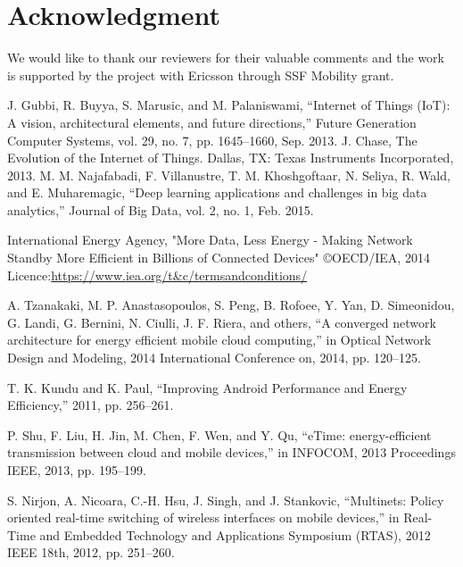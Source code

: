 \documentclass[journal]{IEEEtran}
\begin{document}
%

\section*{Acknowledgment}
We would like to thank our reviewers for their valuable comments and the work is supported by the project with Ericsson through SSF Mobility grant.

\ifCLASSOPTIONcaptionsoff
  \newpage
\fi

\begin{thebibliography}{9}
J. Gubbi, R. Buyya, S. Marusic, and M. Palaniswami, “Internet of Things (IoT): A vision, architectural elements, and future directions,” Future Generation Computer Systems, vol. 29, no. 7, pp. 1645–1660, Sep. 2013.
J. Chase, The Evolution of the Internet of Things. Dallas, TX: Texas Instruments Incorporated, 2013.
M. M. Najafabadi, F. Villanustre, T. M. Khoshgoftaar, N. Seliya, R. Wald, and E. Muharemagic, “Deep learning applications and challenges in big data analytics,” Journal of Big Data, vol. 2, no. 1, Feb. 2015.

International Energy Agency, "More Data, Less Energy - Making Network Standby More Efficient in Billions of Connected Devices" \copyright OECD/IEA, 2014 Licence:\url{https://www.iea.org/t&c/termsandconditions/}

A. Tzanakaki, M. P. Anastasopoulos, S. Peng, B. Rofoee, Y. Yan, D. Simeonidou, G. Landi, G. Bernini, N. Ciulli, J. F. Riera, and others, “A converged network architecture for energy efficient mobile cloud computing,” in Optical Network Design and Modeling, 2014 International Conference on, 2014, pp. 120–125.

T. K. Kundu and K. Paul, “Improving Android Performance and Energy Efficiency,” 2011, pp. 256–261.

P. Shu, F. Liu, H. Jin, M. Chen, F. Wen, and Y. Qu, “eTime: energy-efficient transmission between cloud and mobile devices,” in INFOCOM, 2013 Proceedings IEEE, 2013, pp. 195–199.

S. Nirjon, A. Nicoara, C.-H. Hsu, J. Singh, and J. Stankovic, “Multinets: Policy oriented real-time switching of wireless interfaces on mobile devices,” in Real-Time and Embedded Technology and Applications Symposium (RTAS), 2012 IEEE 18th, 2012, pp. 251–260.


\end{thebibliography}
\end{document}
